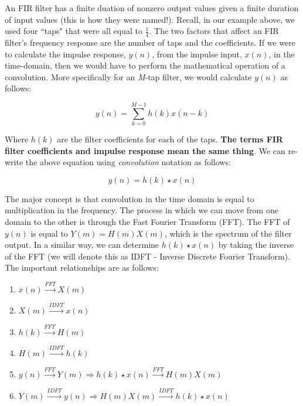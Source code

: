 An FIR filter has a finite duation of nonzero output values given a finite duration of input values (this is how they were named!).  Recall, in our example above, we used four ``taps" that were all equal to $\frac{1}{4}$.  The two factors that affect an FIR filter's frequency response are the number of taps and the coefficients\cite{lyons:intro}.  If we were to calculate the impulse response, $y(n)$, from the impulse input, $x(n)$, in the time-domain, then we would have to perform the mathematical operation of a convolution.  More specifically for an \textit{M}-tap filter, we would calculate $y(n)$ as follows: 

$$y(n) = \sum_{k=0}^{M-1}  h(k)x(n-k)$$

Where $h(k)$ are the filter coefficients for each of the taps.  \textbf{The terms FIR filter coefficients and impulse response mean the same thing}\cite{lyons:intro}.  We can re-write the above equation using \textit{convolution} notation as follows: 

$$y(n) = h(k) \star x(n)$$  

The major concept is that convolution in the time domain is equal to multiplication in the frequency.  The process in which we can move from one domain to the other is through the Fast Fourier Transform (FFT).  The FFT of $y(n)$ is equal to $Y(m) = H(m) X(m)$, which is the spectrum of the filter output.  In a similar way, we can determine $h(k)\star x(n)$ by taking the inverse of the FFT (we will denote this as IDFT - Inverse Discrete Fourier Transform)\cite{lyons:intro}.  The important relationships are as follows: 

\begin{enumerate}
\item $x(n) \overset{FFT}{\longrightarrow} X(m)$
\item $X(m) \overset{IDFT}{\longrightarrow} x(n)$
\item $h(k) \overset{FFT}{\longrightarrow} H(m)$
\item $H(m) \overset{IDFT}{\longrightarrow} h(k)$
\item $y(n) \overset{FFT}{\longrightarrow} Y(m) \Rightarrow h(k)\star x(n) \overset{FFT}{\longrightarrow} H(m) X(m)$
\item $Y(m) \overset{IDFT}{\longrightarrow} y(n) \Rightarrow H(m) X(m) \overset{IDFT}{\longrightarrow} h(k)\star x(n)$
\end{enumerate}    


